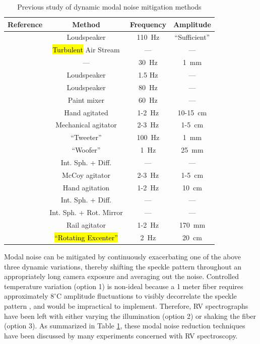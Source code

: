 \documentclass[twocolumn]{emulateapj}
\begin{document}
\begin{table}
\centering
\caption{Previous study of dynamic modal noise mitigation methods}
	\begin{tabular}{cccc}
		\hline
		Reference & Method & Frequency & Amplitude \\
		\hline\hline
		\citet{Daino1980} & Loudspeaker & \SI{110}{\hertz} & ``Sufficient'' \\
		\hline
		\citet{Hill1980} & \hl{Turbulent} Air Stream & --- & --- \\
		\hline
		\citet{Baudrand2001} & --- & \SI{30}{\hertz} & \SI{1}{\milli\meter} \\
		\hline
		\multirow{2}{*}{\citet{Lemke2011}} & Loudspeaker & 1.5 Hz & --- \\
		 & Loudspeaker & \SI{80}{\hertz} & --- \\
		\hline
		\multirow{3}{*}{\citet{McCoy2012}} & Paint mixer & \SI{60}{\hertz} & --- \\
		 & Hand agitated & 1-\SI{2}{\hertz} & 10-\SI{15}{\centi\meter} \\
		 & Mechanical agitator & 2-\SI{3}{\hertz} & 1-\SI{5}{\centi\meter} \\
		\hline
		\multirow{2}{*}{\citet{Plavchan2013}} & ``Tweeter'' & \SI{100}{\hertz} & \SI{1}{\milli\meter} \\
		 & ``Woofer'' & \SI{1}{\hertz} & \SI{25}{\milli\meter} \\
		\hline
		\multirow{3}{*}{\citet{Mahadevan2014}} & Int. Sph. + Diff. & --- & ---\\
		 & McCoy agitator & 2-\SI{3}{\hertz} & 1-\SI{5}{\centi\meter} \\
		 & Hand agitation & 1-\SI{2}{\hertz} & \SI{10}{\centi\meter} \\
		\hline
		\multirow{2}{*}{\citet{Halverson2014}} & Int. Sph. + Diff. & --- & --- \\
		 & Int. Sph. + Rot. Mirror & --- & --- \\
		\hline		
		\citet{Roy2014} & Rail agitator & 1-\SI{2}{\hertz} & \SI{170}{\milli\meter} \\
		\hline
		\citet{Sablowski2015} & \hl{``Rotating Excenter''} & \SI{2}{\hertz} & \SI{20}{\centi\meter} \\
		\hline
	\end{tabular}
\label{table:previous_studies}
\end{table}

Modal noise can be mitigated by continuously exacerbating one of the above three dynamic variations, thereby shifting the speckle pattern throughout an appropriately long camera exposure and averaging out the noise. Controlled temperature variation (option 1) is non-ideal because a 1 meter fiber requires approximately $8 ^\circ \mathrm{C}$ amplitude fluctuations to visibly decorrelate the speckle pattern \citep{Redding2013}, and would be impractical to implement. Therefore, RV spectrographs have been left with either varying the illumination (option 2) or shaking the fiber (option 3). As summarized in Table \ref{table:previous_studies}, these modal noise reduction techniques have been discussed by many experiments concerned with RV spectroscopy.
\end{document}
